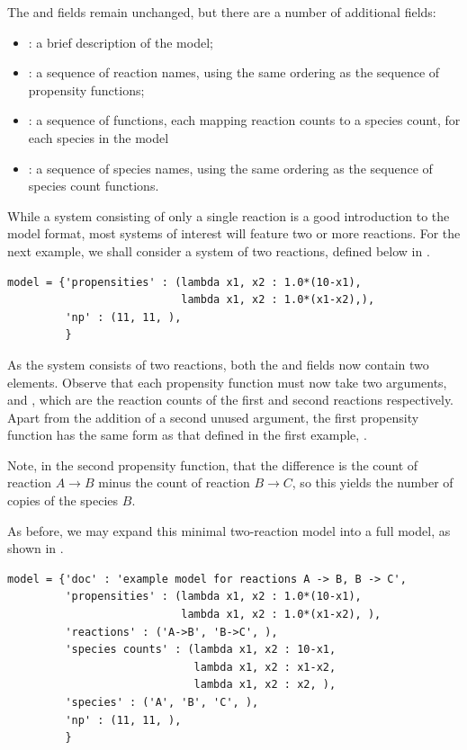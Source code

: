 The  and  fields remain unchanged, but there are
a number of additional fields:
\begin{itemize}
  \item {} : a brief description of the model;
  \item {} : a sequence of reaction names, using the same
  ordering as the sequence of propensity functions;
  \item {} : a sequence of functions, each mapping
  reaction counts to a species count, for each species in the model
  \item {} : a sequence of species names, using the same ordering
  as the sequence of species count functions.
\end{itemize}

While a system consisting of only a single reaction is a good introduction
to the model format, most systems of interest will feature two or more
reactions.
For the next example, we shall consider a system of two reactions,
defined below in .

 \begin{lstlisting}[frame=tb,
caption={A minimal model definition for the system
$A \rightarrow B$, $B \rightarrow C$.},
label=model2a]
model = {'propensities' : (lambda x1, x2 : 1.0*(10-x1),
                           lambda x1, x2 : 1.0*(x1-x2),),
         'np' : (11, 11, ),
         }
\end{lstlisting}

As the system consists of two reactions, both the  and
 fields now contain two elements. Observe that each propensity function
must now take two arguments,  and , which are the reaction counts
of the first and second reactions respectively. Apart from the addition
of a second unused argument, the first propensity function has the same form
as that defined in the first example, .

Note, in the second propensity function, that the difference  is
the count of reaction $A \rightarrow B$ minus the count of reaction
$B \rightarrow C$, so this yields the number of copies of the species $B$.

As before, we may expand this minimal two-reaction model into a full model,
as shown in .

\begin{lstlisting}[frame=tb,
caption={A full model definition for the system
$A \rightarrow B$, $B \rightarrow C$.},
label=model2b]
model = {'doc' : 'example model for reactions A -> B, B -> C',
         'propensities' : (lambda x1, x2 : 1.0*(10-x1),
                           lambda x1, x2 : 1.0*(x1-x2), ),
         'reactions' : ('A->B', 'B->C', ),
         'species counts' : (lambda x1, x2 : 10-x1,
                             lambda x1, x2 : x1-x2,
                             lambda x1, x2 : x2, ),
         'species' : ('A', 'B', 'C', ),
         'np' : (11, 11, ),
         }
\end{lstlisting}

